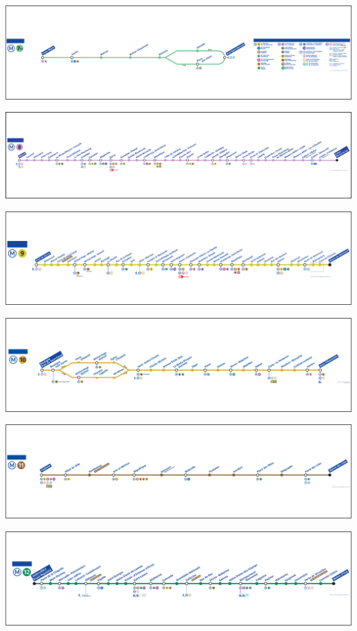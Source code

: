 \documentclass[,french]{article}
\begin{document}
\includegraphics{img/plan_lignes/plan-de-ligne_metro_ligne-7b.pdf}

\includegraphics{img/plan_lignes/plan-de-ligne_metro_ligne-8.pdf}

\includegraphics{img/plan_lignes/plan-de-ligne_metro_ligne-9.pdf}

\includegraphics{img/plan_lignes/plan-de-ligne_metro_ligne-10.pdf}

\includegraphics{img/plan_lignes/plan-de-ligne_metro_ligne-11.pdf}

\includegraphics{img/plan_lignes/plan-de-ligne_metro_ligne-12.pdf}
\end{document}
